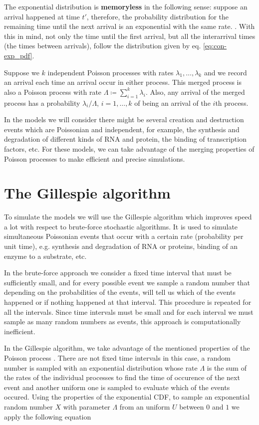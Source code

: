 The exponential distribution is \textbf{memoryless} in the following sense: suppose an arrival happened at time $t'$, therefore, the probability distribution for the remaining time until the next arrival is an exponential with the same rate. . With this in mind, not only the time until the first arrival, but all the interarrival times (the times between arrivals), follow the distribution given by eq. \eqref{eq:con-exp_pdf}.

Suppose we $k$ independent Poisson processes with rates $\lambda_1,\dotsc,\lambda_k$ and we record an arrival each time an arrival occur in either process. This merged process is also a Poisson process with rate $\Lambda\coloneqq\sum_{i=1}^k\lambda_i$. Also, any arrival of the merged process has a probability $\lambda_i/\Lambda$, $i=1,\dotsc,k$ of being an arrival of the $i$th process.

In the models we will consider there might be several creation and destruction events which are Poissonian and independent, for example, the synthesis and degradation of different kinds of RNA and protein, the binding of transcription factors, etc. For these models, we can take advantage of the merging properties of Poisson processes to make efficient and precise simulations.

\section{The Gillespie algorithm}

To simulate the models we will use the Gillespie algorithm \cite{gillespie77} which improves speed a lot with respect to brute-force stochastic algorithms. It is used to simulate simultaneous Poissonian events that occur with a certain rate (probability per unit time), e.g. synthesis and degradation of RNA or proteins, binding of an enzyme to a substrate, etc.

In the brute-force approach we consider a fixed time interval that must be sufficiently small, and for every possible event we sample a random number that depending on the probabilities of the events, will tell us which of the events happened or if nothing happened at that interval. This procedure is repeated for all the intervals. Since time intervals must be small and for each interval we must sample as many random numbers as events, this approach is computationally inefficient.

In the Gillespie algorithm, we take advantage of the mentioned properties of the Poisson process \cite{bertsekas08}. There are not fixed time intervals in this case, a random number is sampled with an exponential distribution whose rate $\Lambda$ is the sum of the rates of the individual processes to find the time of occurence of the next event and another uniform one is sampled to evaluate which of the events occured. Using the properties of the exponential CDF, to sample an exponential random number $X$ with parameter $\Lambda$ from an uniform $U$ between $0$ and $1$ we apply the following equation

